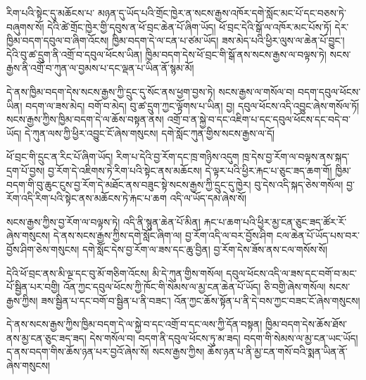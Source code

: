\documentclass[12pt]{nextbook}
\begin{document}
\begin{readersection}{རིག་པའི་སྟེང་དུ་མཆོངས་པ་}
མཉན་དུ་ཡོད་པའི་གྲོང་ཁྱེར་ན་སངས་རྒྱས་འཁོར་དགེ་སློང་མང་པོ་དང་བཅས་ཏེ་བཞུགས་སོ། དེའི་ཚེ་གྲོང་ཁྱེར་གྱི་དབུས་ན་ཕོ་བྲང་ཆེན་པོ་ཞིག་ཡོད། ཕོ་བྲང་དེའི་སྒོ་ལ་འཁོར་མང་པོས་ཏོ། དེར་ཁྱིམ་བདག་དབུལ་བ་ཞིག་འོངས། ཁྱིམ་བདག་དེ་ལ་ངན་པ་ཙམ་ཡོད། ཟས་མེད་པའི་ཕྱིར་ལུས་ལ་ཆེན་པོ་བྱུང་། དེའི་བུ་ཚ་དྲུག་ནི་འགྲོ་བ་དབུལ་ཕོངས་ཡིན། ཁྱིམ་བདག་དེས་ཕོ་བྲང་གི་སྒོ་ནས་སངས་རྒྱས་ལ་བལྟས་ཏེ། སངས་རྒྱས་ནི་འགྲོ་བ་ཀུན་ལ་བྱམས་པ་དང་ལྡན་པ་ཡིན་ནོ་སྙམ་མོ།

དེ་ནས་ཁྱིམ་བདག་དེས་སངས་རྒྱས་ཀྱི་དྲུང་དུ་སོང་ནས་ཕྱག་བྱས་ཏེ། སངས་རྒྱས་ལ་གསོལ་བ། བདག་དབུལ་ཕོངས་ཡིན། བདག་ལ་ཟས་མེད། བགོ་བ་མེད། བུ་ཚ་དྲུག་ཀྱང་ལྟོགས་པ་ཡིན། བྱ། དབུལ་ཕོངས་འདི་འབྱུང་ཞེས་གསོལ་ཏོ། སངས་རྒྱས་ཀྱིས་ཁྱིམ་བདག་དེ་ལ་ཆོས་བསྟན་ནས། འགྲོ་བ་ན་སྐྱེ་བ་དང་འཇིག་པ་དང་དབུལ་ཕོངས་དང་བདེ་བ་ཡོད། དེ་ཀུན་ལས་ཀྱི་ཕྱིར་འབྱུང་ངོ་ཞེས་གསུངས། དགེ་སློང་ཀུན་གྱིས་སངས་རྒྱས་ལ་དོ།

ཕོ་བྲང་གི་དྲུང་ན་རིང་པོ་ཞིག་ཡོད། རིག་པ་དེའི་བྱ་རོག་དང་ཁྲ་གཉིས་འདུག ཁྲ་དེས་བྱ་རོག་ལ་བལྟས་ནས་སྐད་དྲག་པོ་བྱས། བྱ་རོག་དེ་འཇིགས་ཏེ་རིག་པའི་སྟེང་ནས་མཆོངས། དེ་ལྟར་པའི་ཕྱིར་རྐང་པ་ཅུང་ཟད་ཆག་གོ། ཁྱིམ་བདག་གི་བུ་ཆུང་ངུས་བྱ་རོག་དེ་མཐོང་ནས་བཟུང་སྟེ་སངས་རྒྱས་ཀྱི་དྲུང་དུ་ཁྱེར། བུ་དེས་འདི་སྐད་ཅེས་གསོལ། བྱ་རོག་འདི་རིག་པའི་སྟེང་ནས་མཆོངས་ཏེ་རྐང་པ་ཆག འདི་ལ་ཡོད་དམ་ཞེས་སོ།

སངས་རྒྱས་ཀྱིས་བྱ་རོག་ལ་བལྟས་ཏེ། འདི་ནི་སྙུན་ཆེན་པོ་མིན། རྐང་པ་ཆག་པའི་ཕྱིར་མྱ་ངན་ཅུང་ཟད་ཚོར་རོ་ཞེས་གསུངས། དེ་ནས་སངས་རྒྱས་ཀྱིས་དགེ་སློང་ཞིག་ལ། བྱ་རོག་འདི་ལ་བར་བྱོས་ཤིག ངལ་ཆེན་པོ་ཡོད་པས་བར་བྱོས་ཤིག་ཅེས་གསུངས། དགེ་སློང་དེས་བྱ་རོག་ལ་ཟས་དང་ཆུ་བྱིན། བྱ་རོག་དེས་ཟོས་ནས་ངལ་གསོས་སོ།

དེའི་ཕོ་བྲང་ནས་མི་ལྔ་དང་བུ་མོ་གཅིག་འོངས། མི་དེ་ཀུན་གྱིས་གསོལ། དབུལ་ཕོངས་འདི་ལ་ཟས་དང་བགོ་བ་མང་པོ་སྦྱིན་པར་བགྱི། འོན་ཀྱང་དབུལ་ཕོངས་ཀྱི་ཁོང་གི་སེམས་ལ་མྱ་ངན་ཆེན་པོ་ཡོད། ཅི་བགྱི་ཞེས་གསོལ། སངས་རྒྱས་ཀྱིས། ཟས་སྦྱིན་པ་དང་བགོ་བ་སྦྱིན་པ་ནི་བཟང་། འོན་ཀྱང་ཆོས་སྟོན་པ་ནི་དེ་བས་ཀྱང་བཟང་ངོ་ཞེས་གསུངས།

དེ་ནས་སངས་རྒྱས་ཀྱིས་ཁྱིམ་བདག་དེ་ལ་སྐྱེ་བ་དང་འགྲོ་བ་དང་ལས་ཀྱི་དོན་བསྟན། ཁྱིམ་བདག་དེས་ཆོས་ཐོས་ནས་མྱ་ངན་ཅུང་ཟད་ཟད། དེས་གསོལ་བ། བདག་ནི་དབུལ་ཕོངས་ཏུ་མ་ཟད། བདག་གི་སེམས་ལ་མྱ་ངན་ཡང་ཡོད། ད་ནས་བདག་གིས་ཆོས་ཉན་པར་བྱའོ་ཞེས་སོ། སངས་རྒྱས་ཀྱིས། ཆོས་ཉན་པ་ནི་མྱ་ངན་གསོ་བའི་སྨན་ཡིན་ནོ་ཞེས་གསུངས།


\end{readersection}
\end{document}
